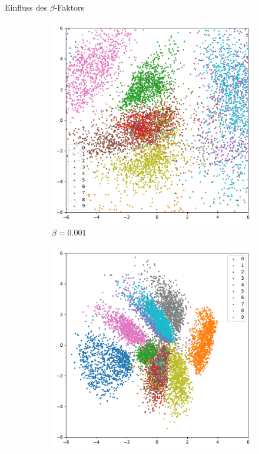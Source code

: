 \documentclass[10pt, compress]{beamer}
\begin{document}
\begin{frame}{Einfluss des $\beta$-Faktors}
\centering
\begin{minipage}[c]{\textwidth}
\centering
  \begin{figure}[hbt]
\centering
\begin{subfigure}{.24\textwidth}
  \centering
  \includegraphics[width=\textwidth]{gfx/evaluation/feature_space/beta=0.001.pdf}
  \caption{$\beta = 0.001$}
\end{subfigure}
\begin{subfigure}{.24\textwidth}
  \centering
  \includegraphics[width=\textwidth]{gfx/evaluation/feature_space/beta=0.1.pdf}

\end{subfigure}
\end{figure}
\end{minipage}
\end{frame}
\end{document}
